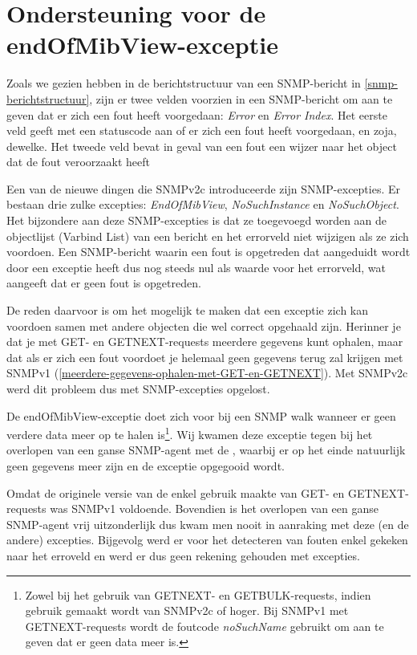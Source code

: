 \section{Ondersteuning voor de endOfMibView-exceptie}
\label{probleem-endofmibview-exceptie}

Zoals we gezien hebben in de berichtstructuur van een SNMP-bericht in \cref{snmp-berichtstructuur},
zijn er twee velden voorzien in een SNMP-bericht om aan te geven dat er zich een fout heeft voorgedaan: \textit{Error} en \textit{Error Index}.
Het eerste veld geeft met een statuscode aan of er zich een fout heeft voorgedaan, en zoja, dewelke.
Het tweede veld bevat in geval van een fout een wijzer naar het object dat de fout veroorzaakt heeft

Een van de nieuwe dingen die SNMPv2c introduceerde zijn SNMP-excepties.
Er bestaan drie zulke excepties: \textit{EndOfMibView}, \textit{NoSuchInstance} en \textit{NoSuchObject}.
Het bijzondere aan deze SNMP-excepties is dat ze toegevoegd worden aan de objectlijst (Varbind List) van een bericht
en het errorveld niet wijzigen als ze zich voordoen\cite{endOfMibView-error-status}.
Een SNMP-bericht waarin een fout is opgetreden dat aangeduidt wordt door een exceptie heeft dus nog steeds nul als waarde voor het errorveld,
wat aangeeft dat er geen fout is opgetreden.

De reden daarvoor is om het mogelijk te maken dat een exceptie zich kan voordoen samen met andere objecten die wel correct opgehaald zijn.
Herinner je dat je met GET- en GETNEXT-requests meerdere gegevens kunt ophalen,
maar dat als er zich een fout voordoet je helemaal geen gegevens terug zal krijgen met SNMPv1 (\cref{meerdere-gegevens-ophalen-met-GET-en-GETNEXT}).
Met SNMPv2c werd dit probleem dus met SNMP-excepties opgelost.

De endOfMibView-exceptie doet zich voor bij een SNMP walk wanneer er geen verdere data meer op te halen is\footnote{
	Zowel bij het gebruik van GETNEXT- en GETBULK-requests, indien gebruik gemaakt wordt van SNMPv2c of hoger.
	Bij SNMPv1 met GETNEXT-requests wordt de foutcode \textit{noSuchName} gebruikt om aan te geven dat er geen data meer is\cite{snmp-exceptions-v2c-to-v1}.
}\cite{snmp-exceptions-explained}.
Wij kwamen deze exceptie tegen bij het overlopen van een ganse SNMP-agent met de \nwmretriever{},
waarbij er op het einde natuurlijk geen gegevens meer zijn en de exceptie opgegooid wordt.

Omdat de originele versie van de \nwmretriever{} enkel gebruik maakte van GET- en GETNEXT-requests was SNMPv1 voldoende.
Bovendien is het overlopen van een ganse SNMP-agent vrij uitzonderlijk dus kwam men nooit in aanraking met deze (en de andere) excepties.
Bijgevolg werd er voor het detecteren van fouten enkel gekeken naar het erroveld en werd er dus geen rekening gehouden met excepties.

